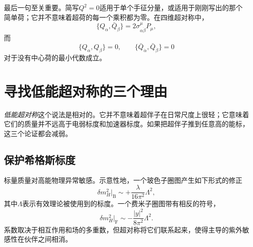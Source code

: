 \begin{classroomqa}
\end{classroomqa}

最后一句至关重要。简写\(Q^2=0\)适用于单个手征分量，或适用于刚刚写出的那个简单荷；它并不意味着超荷的每一个乘积都为零。在四维超对称中，
\begin{equation}
\{Q_\alpha,\bar Q_{\dot\beta}\}
=2\sigma^\mu_{\alpha\dot\beta}P_\mu,
\end{equation}
而
\begin{equation}
\{Q_\alpha,Q_\beta\}=0,
\qquad
\{\bar Q_{\dot\alpha},\bar Q_{\dot\beta}\}=0
\end{equation}
对于没有中心荷的最小代数成立。

\section{寻找低能超对称的三个理由}

\begin{classroomqa}
\end{classroomqa}

\emph{低能超对称}这个说法是相对的。它并不意味着超伴子在日常尺度上很轻；它意味着它们的质量并不远高于电弱标度和加速器标度。如果把超伴子推到任意高的能标，这三个论证都会减弱。

\subsection{保护希格斯标度}

标量质量对高能物理异常敏感。示意性地，一个玻色子圈图产生如下形式的修正
\begin{equation}
\delta m_H^2\big|_{\mathrm B}
\sim +\frac{\lambda}{16\pi^2}\Lambda^2,
\end{equation}
其中\(\Lambda\)表示有效理论被使用到的标度。一个费米子圈图带有相反的符号，
\begin{equation}
\delta m_H^2\big|_{\mathrm F}
\sim -\frac{|y|^2}{8\pi^2}\Lambda^2.
\end{equation}
系数取决于相互作用和场的多重数，但超对称将它们联系起来，使得主导的紫外敏感性在伙伴之间相消。

